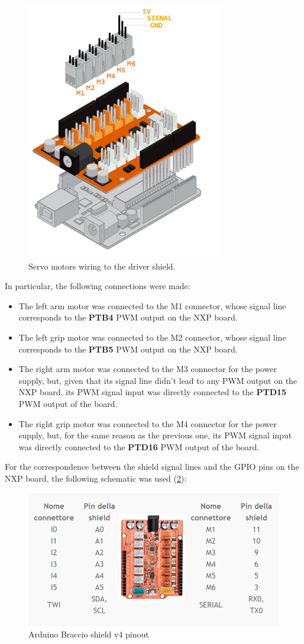 \documentclass{report}
\begin{document}
\begin{figure}[h]
    \centering
    \includegraphics[width=0.5\linewidth]{images/Requirements/braccio_shield_wiring.png}
    \caption{Servo motors wiring to the driver shield.}
    \label{fig:shield-wiring}
\end{figure}

In particular, the following connections were made:
\begin{itemize}
    \item The left arm motor was connected to the M1 connector, whose signal line corresponds to the \textbf{PTB4} PWM output on the NXP board.
    \item The left grip motor was connected to the M2 connector, whose signal line corresponds to the \textbf{PTB5} PWM output on the NXP board.
    \item The right arm motor was connected to the M3 connector for the power supply, but, given that its signal line didn't lead to any PWM output on the NXP board, its PWM signal input was directly connected to the \textbf{PTD15} PWM output of the board.
    \item The right grip motor was connected to the M4 connector for the power supply, but, for the same reason as the previous one, its PWM signal input was directly connected to the \textbf{PTD16} PWM output of the board.
\end{itemize}

For the correspondence between the shield signal lines and the GPIO pins on the NXP board, the following schematic was used (\ref{fig:shield-pinout}):

\begin{figure}[h]
    \centering
    \includegraphics[width=0.75\linewidth]{images/Requirements/shield_pinout.png}
    \caption{Arduino Braccio shield v4 pinout}
    \label{fig:shield-pinout}
\end{figure}
\end{document}
